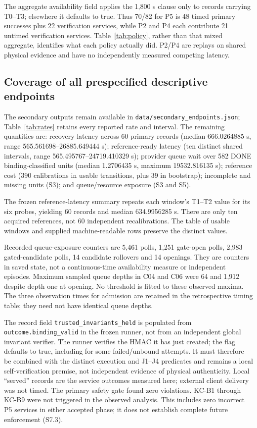 \documentclass[11pt,a4paper]{article}
\begin{document}
The aggregate availability field applies the 1,800 s clause only to records carrying T0--T3; elsewhere it defaults to true. Thus 70/82 for P5 is 48 timed primary successes plus 22 verification services, while P2 and P4 each contribute 21 untimed verification services. Table~\ref{tab:policy}, rather than that mixed aggregate, identifies what each policy actually did. P2/P4 are replays on shared physical evidence and have no independently measured competing latency.

\subsection{Coverage of all prespecified descriptive endpoints}
The secondary outputs remain available in \texttt{data/secondary\_endpoints.json}; Table~\ref{tab:rates} retains every reported rate and interval. The remaining quantities are: recovery latency across 60 primary records (median 666.0264885 s, range 565.561698--26885.649444 s); reference-ready latency (ten distinct shared intervals, range 565.495767--24719.410329 s); provider queue wait over 582 DONE binding-classified units (median 1.2706435 s, maximum 19532.816135 s); reference cost (390 calibrations in usable transitions, plus 39 in bootstrap); incomplete and missing units (S3); and queue/resource exposure (S3 and S5).

The frozen reference-latency summary repeats each window's T1--T2 value for its six probes, yielding 60 records and median 634.9956285 s. There are only ten acquired references, not 60 independent recalibrations. The table of usable windows and supplied machine-readable rows preserve the distinct values.

Recorded queue-exposure counters are 5,461 polls, 1,251 gate-open polls, 2,983 gated-candidate polls, 14 candidate rollovers and 14 openings. They are counters in saved state, not a continuous-time availability measure or independent episodes. Maximum sampled queue depths in C04 and C06 were 64 and 1,912 despite depth one at opening. No threshold is fitted to these observed maxima. The three observation times for admission are retained in the retrospective timing table; they need not have identical queue depths.

The record field \texttt{trusted\_invariants\_held} is populated from \texttt{outcome.binding\_valid} in the frozen runner, not from an independent global invariant verifier. The runner verifies the HMAC it has just created; the flag defaults to true, including for some failed/unbound attempts. It must therefore be combined with the distinct execution and J1--J4 predicates and remains a local self-verification premise, not independent evidence of physical authenticity. Local ``served'' records are the service outcomes measured here; external client delivery was not timed. The primary safety gate found zero violations. KC-B1 through KC-B9 were not triggered in the observed analysis. This includes zero incorrect P5 services in either accepted phase; it does not establish complete future enforcement (S7.3).
\end{document}
